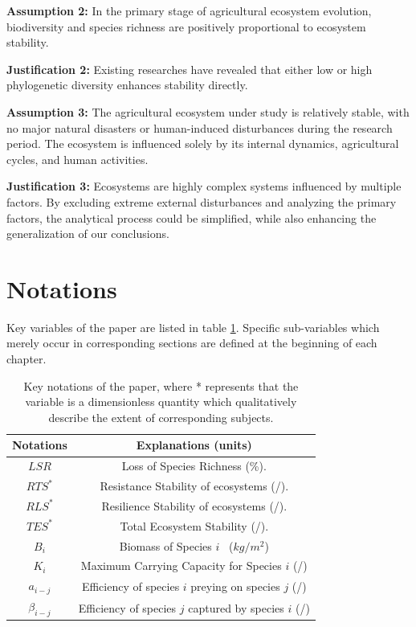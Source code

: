 \documentclass[12pt]{article}
\begin{document}
\textbf{Assumption 2: }In the primary stage of agricultural ecosystem evolution, biodiversity and species richness are positively proportional to ecosystem stability.

\textbf{Justification 2: }Existing researches \cite{1} \cite{2} \cite{3} have revealed that either low or high phylogenetic diversity enhances stability directly.

\textbf{Assumption 3: }The agricultural ecosystem under study is relatively stable, with no major natural disasters or human-induced disturbances during the research period. The ecosystem is influenced solely by its internal dynamics, agricultural cycles, and human activities.

\textbf{Justification 3: }Ecosystems are highly complex systems influenced by multiple factors. By excluding extreme external disturbances and analyzing the primary factors, the analytical process could be simplified, while also enhancing the generalization of our conclusions.



\section{Notations}
\hspace{1.5em}Key variables of the paper are listed in table \ref{notations}. Specific sub-variables which merely occur in corresponding sections are defined at the beginning of each chapter.  
\begin{table}[h]
    \centering
    \setlength{\tabcolsep}{45pt}
    \begin{tabular}{cc}
    \toprule[2pt]
    \textbf{Notations} & \textbf{Explanations (units)} \\
    \midrule[1pt]
        $LSR$ & Loss of Species Richness (\%).\\
        $RTS^{*}$ & Resistance Stability of ecosystems (/).\\
         $RLS^{*}$ & Resilience Stability of ecosystems (/).\\
         $TES^{*}$ & Total Ecosystem Stability (/). \\
         $B_i$ & Biomass of Species $i$ \ ($kg/m^2$) \\
         $K_i$ & Maximum Carrying Capacity for Species $i$ (/)\\
         $a_{i-j}$ & Efficiency of species $i$ preying on species $j$ (/)\\
         $\beta_{i-j}$ & Efficiency of species $j$ captured by species $i$ (/)\\
    \bottomrule[2pt]
    \end{tabular}
    \caption{Key notations of the paper, where * represents that the variable is a dimensionless quantity which qualitatively describe the extent of corresponding subjects.}
    \label{notations}
\end{table}
\end{document}
